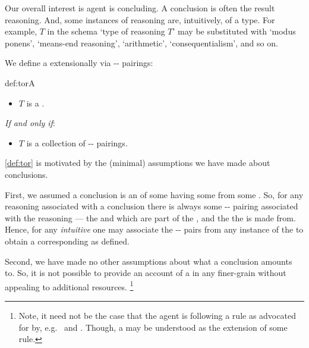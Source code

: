 \begin{note}
  Our overall interest is agent is concluding.
  A conclusion is often the result reasoning.
  And, some instances of reasoning are, intuitively, of a type.
  For example, \(T\) in the schema `type of reasoning \(T\)' may be substituted with `modus ponens', `means-end reasoning', `arithmetic', `consequentialism', and so on.

  We define a  extensionally via -- pairings:

  \begin{rdefinition}{def:tor}{A }
    \mbox{ }
    \vspace{-\baselineskip}
    \begin{itemize}
    \item
      \(T\) is a \torN{}.
    \end{itemize}

    \emph{If and only if}:

    \begin{itemize}
    \item
      \(T\) is a collection of -- pairings.
    \end{itemize}
    \vspace{-\baselineskip}
  \end{rdefinition}

  \noindent%
  \autoref{def:tor} is motivated by the (minimal) assumptions we have made about conclusions.

  First, we assumed a conclusion is an \evalion{} of some  having some  from some .
  So, for any reasoning associated with a conclusion there is always some -- pairing associated with the reasoning --- the  and  which are part of the \evalion{}, and the  the \evalion{} is made from.
  Hence, for any \emph{intuitive} \torN{} one may associate the -- pairs from any instance of the \torNa{} to obtain a corresponding \torN{} as defined.

  Second, we have made no other assumptions about what a conclusion amounts to.
  So, it is not possible to provide an account of a  in any finer-grain without appealing to additional resources.%
  \footnote{
    Note, it need not be the case that the agent is following a rule as advocated for by, e.g.\ \textcite{Boghossian:2008vf,Boghossian:2012vb} and \textcite{Broome:2002aa,Broome:2013aa}.
    Though, a \torNa{} may be understood as the extension of some rule.
  }
\end{note}


